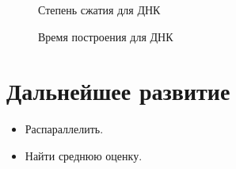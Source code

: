 \documentclass[utf8]{beamer}
\begin{document}
\begin{frame}
	\begin{figure}[!h]
	    \caption{Степень сжатия для ДНК}
	\end{figure}
\end{frame}

\begin{frame}
	\begin{figure}[!h]
    \caption{Время построения для ДНК}
	\end{figure}
\end{frame}

\section{Дальнейшее развитие}

\begin{frame}
\begin{itemize}
  \item Распараллелить.
\pause
  \item Найти среднюю оценку.
\end{itemize}
\end{frame}
\end{document}
